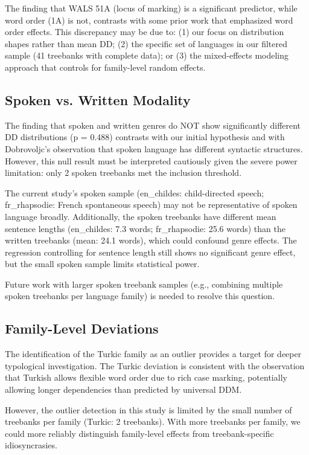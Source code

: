 \documentclass[11pt,letterpaper]{article}
\begin{document}
The finding that WALS 51A (locus of marking) is a significant predictor, while word order (1A) is not, contrasts with some prior work \cite{Futrell2015, Niu2023} that emphasized word order effects. This discrepancy may be due to: (1) our focus on distribution shapes rather than mean DD; (2) the specific set of languages in our filtered sample (41 treebanks with complete data); or (3) the mixed-effects modeling approach that controls for family-level random effects.

\subsection{Spoken vs. Written Modality}

The finding that spoken and written genres do NOT show significantly different DD distributions (p = 0.488) contrasts with our initial hypothesis and with Dobrovoljc's \cite{Dobrovoljc2025} observation that spoken language has different syntactic structures. However, this null result must be interpreted cautiously given the severe power limitation: only 2 spoken treebanks met the inclusion threshold.

The current study's spoken sample (en\_childes: child-directed speech; fr\_rhapsodie: French spontaneous speech) may not be representative of spoken language broadly. Additionally, the spoken treebanks have different mean sentence lengths (en\_childes: 7.3 words; fr\_rhapsodie: 25.6 words) than the written treebanks (mean: 24.1 words), which could confound genre effects. The regression controlling for sentence length still shows no significant genre effect, but the small spoken sample limits statistical power.

Future work with larger spoken treebank samples (e.g., combining multiple spoken treebanks per language family) is needed to resolve this question.

\subsection{Family-Level Deviations}

The identification of the Turkic family as an outlier provides a target for deeper typological investigation. The Turkic deviation is consistent with the observation that Turkish allows flexible word order due to rich case marking, potentially allowing longer dependencies than predicted by universal DDM.

However, the outlier detection in this study is limited by the small number of treebanks per family (Turkic: 2 treebanks). With more treebanks per family, we could more reliably distinguish family-level effects from treebank-specific idiosyncrasies.
\end{document}
